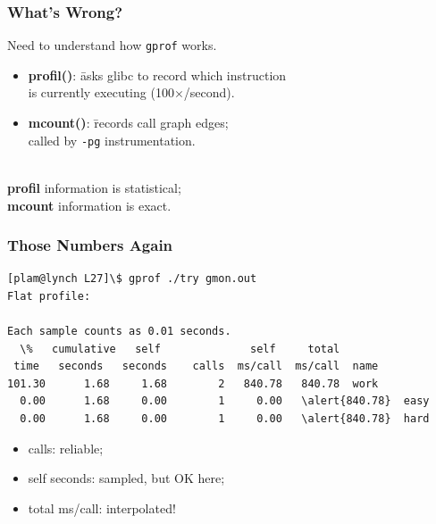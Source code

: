 \begin{frame}[fragile]
  \frametitle{What's Wrong?}

  
    Need to understand how {\tt gprof} works.\\[1em]
    \begin{itemize}
    \item
      \begin{tabbing}
      {\bf profil()}: \= asks glibc to record which instruction \\
      \> is currently executing
      (100$\times$/second).
      \end{tabbing}
    \item
      \begin{tabbing}
        {\bf mcount()}: \= records call graph edges;\\
        \> called by {\tt -pg} instrumentation.
      \end{tabbing}
    \end{itemize}
~\\
    {\bf profil} information is statistical; \\
    {\bf mcount} information is exact.

\end{frame}

\begin{frame}[fragile]
  \frametitle{Those Numbers Again}

{\scriptsize
\begin{verbatim}
[plam@lynch L27]\$ gprof ./try gmon.out
Flat profile:

Each sample counts as 0.01 seconds.
  \%   cumulative   self              self     total           
 time   seconds   seconds    calls  ms/call  ms/call  name    
101.30      1.68     1.68        2   840.78   840.78  work
  0.00      1.68     0.00        1     0.00   \alert{840.78}  easy
  0.00      1.68     0.00        1     0.00   \alert{840.78}  hard
\end{verbatim}
}


  \begin{itemize}
  \item calls: reliable;
  \item self seconds: sampled, but OK here;
    \item total ms/call: interpolated!
  \end{itemize}

\end{frame}

